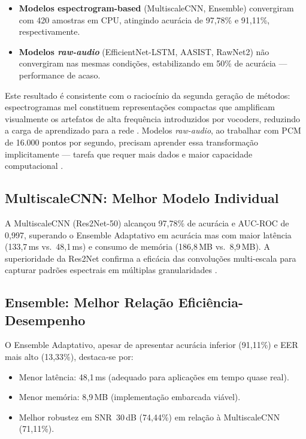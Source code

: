 \documentclass[12pt,a4paper]{article}
\begin{document}
\begin{itemize}
    \item \textbf{Modelos espectrogram-based} (MultiscaleCNN, Ensemble)
    convergiram com 420 amostras em CPU, atingindo acur\'{a}cia de
    97,78\% e 91,11\%, respectivamente.
    \item \textbf{Modelos \textit{raw-audio}} (EfficientNet-LSTM, AASIST,
    RawNet2) n\~{a}o convergiram nas mesmas condi\c{c}\~{o}es,
    estabilizando em 50\% de acur\'{a}cia --- performance de acaso.
\end{itemize}

Este resultado \'{e} consistente com o racioc\'{i}nio da segunda gera\c{c}\~{a}o
de m\'{e}todos: espectrogramas mel constituem representa\c{c}\~{o}es compactas
que amplificam visualmente os artefatos de alta frequ\^{e}ncia introduzidos
por vocoders, reduzindo a carga de aprendizado para a rede \cite{bartusiak2022}.
Modelos \textit{raw-audio}, ao trabalhar com PCM de 16.000 pontos por
segundo, precisam aprender essa transforma\c{c}\~{a}o implicitamente ---
tarefa que requer mais dados e maior capacidade computacional
\cite{tak2021rawnet2, jung2022aasist}.

\subsection{MultiscaleCNN: Melhor Modelo Individual}

A MultiscaleCNN (Res2Net-50) alcan\c{c}ou 97,78\% de acur\'{a}cia e
AUC-ROC de 0,997, superando o Ensemble Adaptativo em acur\'{a}cia mas
com maior lat\^{e}ncia (133,7\,ms vs.\ 48,1\,ms) e consumo de mem\'{o}ria
(186,8\,MB vs.\ 8,9\,MB).
A superioridade da Res2Net confirma a efic\'{a}cia das convolu\c{c}\~{o}es
multi-escala para capturar padr\~{o}es espectrais em m\'{u}ltiplas
granularidades \cite{gao2021res2net}.

\subsection{Ensemble: Melhor Rela\c{c}\~{a}o Efici\^{e}ncia-Desempenho}

O Ensemble Adaptativo, apesar de apresentar acur\'{a}cia inferior
(91,11\%) e EER mais alto (13,33\%), destaca-se por:
\begin{itemize}
    \item Menor lat\^{e}ncia: 48,1\,ms (adequado para aplica\c{c}\~{o}es em
    tempo quase real).
    \item Menor mem\'{o}ria: 8,9\,MB (implementa\c{c}\~{a}o embarcada
    vi\'{a}vel).
    \item Melhor robustez em SNR~30\,dB (74,44\%) em rela\c{c}\~{a}o
    \`{a} MultiscaleCNN (71,11\%).
\end{itemize}
\end{document}
